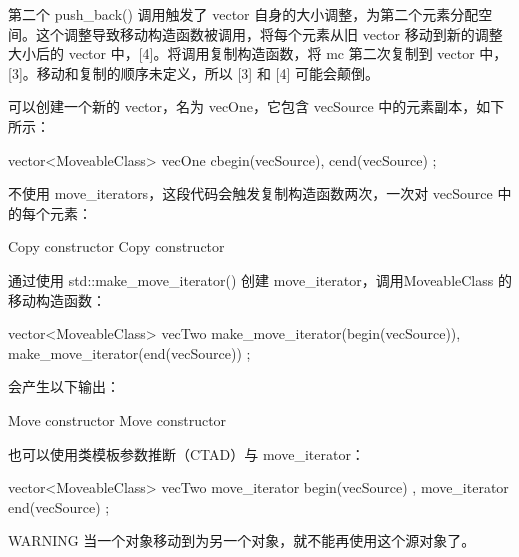 第二个 push\_back() 调用触发了 vector 自身的大小调整，为第二个元素分配空间。这个调整导致移动构造函数被调用，将每个元素从旧 vector 移动到新的调整大小后的 vector 中，[4]。将调用复制构造函数，将 mc 第二次复制到 vector 中，[3]。移动和复制的顺序未定义，所以 [3] 和 [4] 可能会颠倒。

可以创建一个新的 vector，名为 vecOne，它包含 vecSource 中的元素副本，如下所示：

\begin{cpp}
vector<MoveableClass> vecOne { cbegin(vecSource), cend(vecSource) };
\end{cpp}

不使用 move\_iterators，这段代码会触发复制构造函数两次，一次对 vecSource 中的每个元素：

\begin{shell}
Copy constructor
Copy constructor
\end{shell}

通过使用 std::make\_move\_iterator() 创建 move\_iterator，调用MoveableClass 的移动构造函数：

\begin{cpp}
vector<MoveableClass> vecTwo { make_move_iterator(begin(vecSource)),
                               make_move_iterator(end(vecSource)) };
\end{cpp}

会产生以下输出：

\begin{shell}
Move constructor
Move constructor
\end{shell}

也可以使用类模板参数推断（CTAD）与 move\_iterator：

\begin{cpp}
vector<MoveableClass> vecTwo { move_iterator { begin(vecSource) },
                               move_iterator { end(vecSource) } };
\end{cpp}

\begin{myWarning}{WARNING}
当一个对象移动到为另一个对象，就不能再使用这个源对象了。
\end{myWarning}














